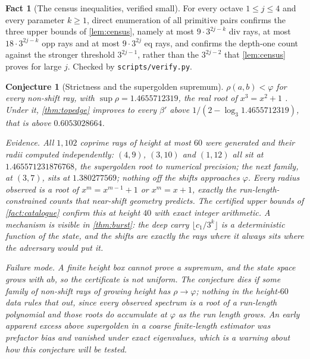 \documentclass[11pt]{amsart}
\newtheorem{conjecture}[theorem]{Conjecture}
\theoremstyle{definition}
\newtheorem{fact}[theorem]{Fact}
\theoremstyle{remark}
\begin{document}
\begin{fact}[The census inequalities, verified small]
\label{fact:census}
For every octave $1 \le j \le 4$ and every parameter $k \ge 1$, direct enumeration of all primitive pairs confirms the three upper bounds of \cref{lem:census}, namely at most $9 \cdot 3^{2j-k}$ div rays, at most $18 \cdot 3^{2j-k}$ opp rays and at most $9 \cdot 3^{2j}$ eq rays, and confirms the depth-one count against the stronger threshold $3^{2j-1}$, rather than the $3^{2j-2}$ that \cref{lem:census} proves for large $j$. Checked by \texttt{scripts/verify.py}.
\end{fact}

\begin{conjecture}[Strictness and the supergolden supremum]
\label{con:supergolden}
$\rho(a,b) < \varphi$ for every non-shift ray, with $\sup \rho = 1.4655712319$, the real root of $x^3 = x^2 + 1$ \cite{oeissuper}. Under it, \cref{thm:topedge} improves to every $\beta'$ above $1/(2 - \log_3 1.4655712319)$, that is above $0.6053028664$.

\emph{Evidence.} All $1{,}102$ coprime rays of height at most $60$ were generated and their radii computed independently: $(4,9)$, $(3,10)$ and $(1,12)$ all sit at $1.465571231876768$, the supergolden root to numerical precision; the next family, at $(3,7)$, sits at $1.380277569$; nothing off the shifts approaches $\varphi$. Every radius observed is a root of $x^m = x^{m-1} + 1$ or $x^m = x + 1$, exactly the run-length-constrained counts that near-shift geometry predicts. The certified upper bounds of \cref{fact:catalogue} confirm this at height $40$ with exact integer arithmetic. A mechanism is visible in \cref{thm:burst}: the deep carry $\lfloor c_1 / 3^k \rfloor$ is a deterministic function of the state, and the shifts are exactly the rays where it always sits where the adversary would put it.

\emph{Failure mode.} A finite height box cannot prove a supremum, and the state space grows with $ab$, so the certificate is not uniform. The conjecture dies if some family of non-shift rays of growing height has $\rho \to \varphi$; nothing in the height-$60$ data rules that out, since every observed spectrum is a root of a run-length polynomial and those roots do accumulate at $\varphi$ as the run length grows. An early apparent excess above supergolden in a coarse finite-length estimator was prefactor bias and vanished under exact eigenvalues, which is a warning about how this conjecture will be tested.
\end{conjecture}
\end{document}
